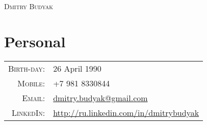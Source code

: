 \documentclass[a4paper,11pt]{article}
\begin{document}
\pagestyle{empty}
\par{\centering
	\Huge \textsc{Dmitry Budyak}
	}\bigskip\par

\section{Personal}
	\begin{tabular}{rl}
	\textsc{Birth-day:} &  26 April 1990 \\
	\textsc{Mobile:}     & +7 981 8330844 \\
	\textsc{Email:}     & \href{mailto:dmitry.budyak@gmail.com}{dmitry.budyak@gmail.com} \\
	\textsc{LinkedIn:} & \href{http://ru.linkedin.com/in/dmitrybudyak}{http://ru.linkedin.com/in/dmitrybudyak}
	\end{tabular}
\end{document}
